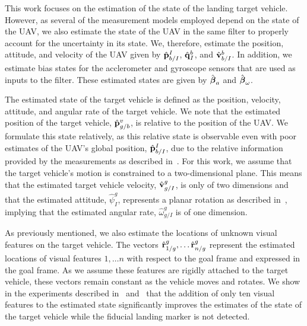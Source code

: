
This work focuses on the estimation of the state of the landing target vehicle.
However, as several of the measurement models employed depend on the state of the
UAV, we also estimate the state of the UAV in the same filter to properly
account for the uncertainty in its state.
We, therefore, estimate the position, attitude, and velocity of the UAV given by
$\hat{\boldsymbol{\mathrm{p}}}_{b/I}^{I}$, $\hat{\boldsymbol{\mathrm{q}}}_I^{b}$, and
$\hat{\boldsymbol{\mathrm{v}}}_{b/I}^b$.
In addition, we estimate bias states for the acclerometer and gyroscope sensors that are
used as inputs to the filter. These estimated states are given by
$\hat{\boldsymbol{\mathrm{\beta}}}_a$ and $\hat{\boldsymbol{\mathrm{\beta}}}_{\omega}$.

The estimated state of the target vehicle is defined as the position, velocity,
attitude, and angular rate of the target vehicle.
We note that the
estimated position of the target vehicle, $\hat{\boldsymbol{\mathrm{p}}}_{g/b}^v$, is relative to the position of the
UAV.
We formulate this state relatively,
as this relative state is observable even with poor estimates of the UAV's global
position, $\hat{\boldsymbol{\mathrm{p}}}_{b/I}^I$, due to the relative information provided
by the measurements as described in~.
For this work, we assume that the target vehicle's
motion is constrained to a two-dimensional plane. This means that the estimated
target vehicle velocity, $\hat{\boldsymbol{\mathrm{v}}}_{g/I}^{g}$, is only of two dimensions and that the
estimated attitude, $\hat{\psi}_{I}^g$, represents a planar rotation as
described in~, implying that the estimated angular
rate, $\hat{\omega}_{g/I}^g$ is of one dimension.

As previously mentioned, we also estimate the locations of unknown visual
features on the target vehicle.
The vectors $\hat{\boldsymbol{\mathrm{r}}}_{1/g}^{g}, \dots \hat{\boldsymbol{\mathrm{r}}}_{n/g}^{g}$ represent the
estimated locations of visual features $1, \dots n$ with respect to the goal frame and
expressed in the goal frame. As we assume these features are rigidly attached to the
target vehicle, these vectors remain constant as the vehicle moves and rotates.
We show in the experiments described in~
and~ that the
addition of only ten visual features to the estimated state significantly
improves the estimates of the state of the target vehicle
while the fiducial landing marker is not detected. 

